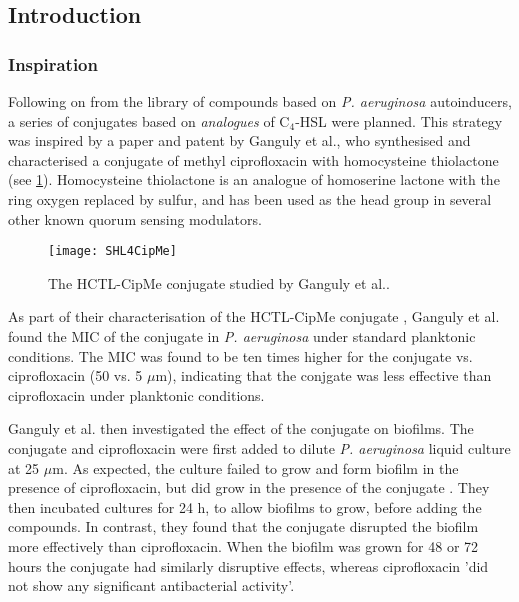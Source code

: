 \subsection{Introduction}

\subsubsection{Inspiration}

Following on from the library of compounds based on \textit{P. aeruginosa} autoinducers, a series of conjugates based on \textit{analogues} of C$_4$-HSL were planned. This strategy was inspired by a paper\cite{Ganguly2011} and patent\cite{Iyer2012} by Ganguly et al., who synthesised and characterised a conjugate  of methyl ciprofloxacin with homocysteine thiolactone (see \ref{fig:SHL4CipMe}). Homocysteine thiolactone is an analogue of homoserine lactone with the ring oxygen replaced by sulfur, and has been used as the head group in several other known quorum sensing modulators\cite{Eberhard1986,Schaefer1996,Passador1996,Smith2003,Chhabra1993,McInnis2011,Geske2007,Janssens2007}.

\begin{figure}[H]
	\begin{center}
		\texttt{[image: SHL4CipMe]}
		\caption{The HCTL-CipMe conjugate  studied by Ganguly et al.\cite{Ganguly2011,Iyer2012}.\label{fig:SHL4CipMe}}
	\end{center}
\end{figure}


As part of their characterisation of the HCTL-CipMe conjugate , Ganguly et al. found the MIC of the conjugate in \textit{P. aeruginosa} under standard planktonic conditions. 
The MIC was found to be ten times higher for the conjugate vs. ciprofloxacin (50 vs. 5 $\mu$m), indicating that the conjgate was less effective than ciprofloxacin under planktonic conditions. 

Ganguly et al. then investigated the effect of the conjugate on biofilms. 
The conjugate and ciprofloxacin were first added to dilute \textit{P. aeruginosa} liquid culture at 25 $\mu$m. 
As expected, the culture failed to grow and form biofilm in the presence of ciprofloxacin, but did grow in the presence of the conjugate . 
They then incubated cultures for 24 h, to allow biofilms to grow, before adding the compounds. In contrast, they found that the conjugate  disrupted the biofilm more effectively than ciprofloxacin. 
When the biofilm was grown for 48 or 72 hours the conjugate had similarly disruptive effects, whereas ciprofloxacin 'did not show any significant antibacterial activity'.

